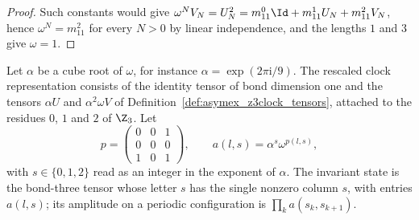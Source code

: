 \begin{proof}
    \leanok
    Such constants would give $\omega^NV_N=U_N^2=m_{11}^{0}\Id+m_{11}^{1}U_N+m_{11}^{2}V_N$,
    hence $\omega^N=m_{11}^{2}$ for every $N>0$ by linear independence, and
    the lengths $1$ and $3$ give $\omega=1$.
\end{proof}


\begin{definition}
    \label{def:asymex_z3clock_rescaled}
    \leanok
    Let $\alpha$ be a cube root of $\omega$, for instance
    $\alpha=\exp(2\pi\mathrm{i}/9)$. The rescaled clock representation consists
    of the identity tensor of bond dimension one and the tensors $\alpha U$
    and $\alpha^2\omega V$ of Definition~\ref{def:asymex_z3clock_tensors},
    attached to the residues $0$, $1$ and $2$ of $\Z_3$. Let
    \begin{equation}
        p=\begin{pmatrix}0&0&1\\0&0&0\\1&0&1\end{pmatrix},
        \qquad a(l,s)=\alpha^{s}\omega^{p(l,s)},
    \end{equation}
    with $s\in\{0,1,2\}$ read as an integer in the exponent of $\alpha$. The
    invariant state is the bond-three tensor whose letter $s$ has the single
    nonzero column $s$, with entries $a(l,s)$; its amplitude on a periodic
    configuration is $\prod_k a(s_k,s_{k+1})$.
\end{definition}

